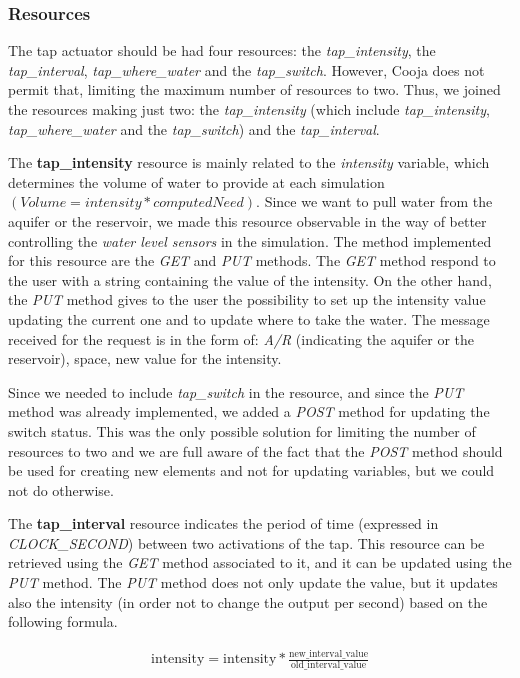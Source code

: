 \subsubsection{Resources}
The tap actuator should be had four resources: the \textit{tap\_intensity}, the \textit{tap\_interval}, \textit{tap\_where\_water} and the \textit{tap\_switch}. However, Cooja does not permit that, limiting the maximum number of resources to two. Thus, we joined the resources making just two: the \textit{tap\_intensity} (which include  \textit{tap\_intensity}, \textit{tap\_where\_water} and the \textit{tap\_switch}) and the \textit{tap\_interval}.

The \textbf{tap\_intensity} resource is mainly related to the \textit{intensity} variable, which determines the volume of water to provide at each simulation ${(Volume=intensity*computedNeed)}$. Since we want to pull water from the aquifer or the reservoir, we made this resource observable in the way of better controlling the \textit{water level sensors} in the simulation. The method implemented for this resource are the \textit{GET} and \textit{PUT} methods. The \textit{GET} method respond to the user with a string containing the value of the intensity. On the other hand, the \textit{PUT} method gives to the user the possibility to set up the intensity value updating the current one and to update where to take the water. The message received for the request is in the form of: \textit{A/R} (indicating the aquifer or the reservoir), space, new value for the intensity. 

Since we needed to include \textit{tap\_switch} in the resource, and since the \textit{PUT} method was already implemented, we added a \textit{POST} method for updating the switch status. This was the only possible solution for limiting the number of resources to two and we are full aware of the fact that the \textit{POST} method should be used for creating new elements and not for updating variables, but we could not do otherwise.

The \textbf{tap\_interval} resource indicates the period of time (expressed in \textit{CLOCK\_SECOND}) between two activations of the tap. This resource can be retrieved using the \textit{GET} method associated to it, and it can be updated using the \textit{PUT} method. The \textit{PUT} method does not only update the value, but it updates also the intensity (in order not to change the output per second) based on the following formula.

\begin{equation}\label{eq1}
  \begin{gathered}
    \text{intensity} = \text{intensity} * \frac{\text{new\_interval\_value}}{\text{old\_interval\_value}}
  \end{gathered}
\end{equation}